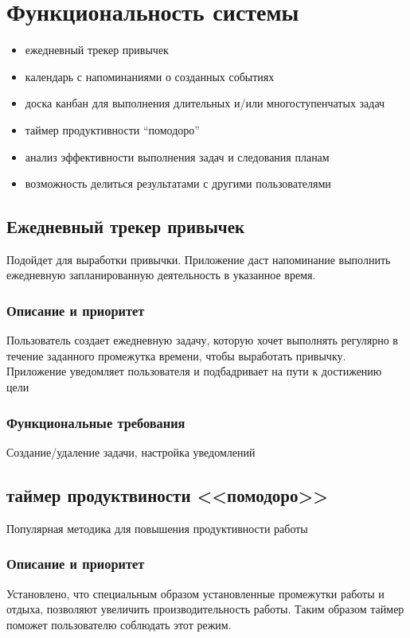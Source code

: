 \chapter{Функциональность системы}
\label{ch:functionality}

\begin{itemize}
\item ежедневный трекер привычек
\item календарь с напоминаниями о созданных событиях
\item доска канбан для выполнения длительных и/или многоступенчатых задач
\item таймер продуктивности “помодоро”
\item анализ эффективности выполнения задач и следования планам
\item возможность делиться результатами с другими пользователями
\end{itemize}


\section{Ежедневный трекер привычек}
Подойдет для выработки привычки. Приложение даст напоминание выполнить ежедневную запланированную деятельность в указанное время.

\subsection{Описание и приоритет}
Пользователь создает ежедневную задачу, которую хочет выполнять регулярно в течение заданного промежутка времени, чтобы выработать привычку. Приложение уведомляет пользователя и подбадривает на пути к достижению цели

\subsection{Функциональные требования}
Создание/удаление задачи, настройка уведомлений


\section{таймер продуктвиности <<помодоро>>}
Популярная методика для повышения продуктивности работы

\subsection{Описание и приоритет}
Установлено, что специальным образом установленные промежутки работы и отдыха, позволяют увеличить производительность работы. Таким образом таймер поможет пользователю соблюдать этот режим.


